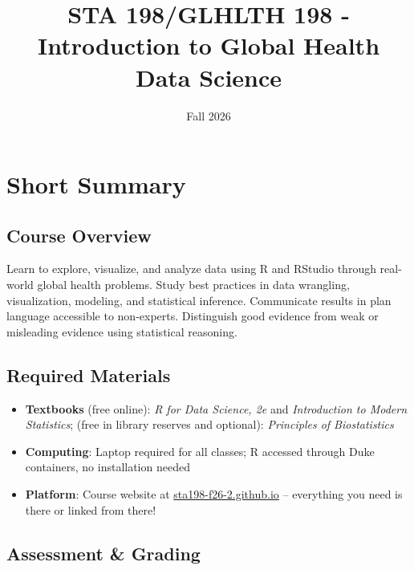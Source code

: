 \documentclass[
  letterpaper,
  DIV=11,
  numbers=noendperiod]{scrartcl}
\title{STA 198/GLHLTH 198 - Introduction to Global Health Data Science}
\subtitle{Fall 2026}
\author{}
\date{}
\providecommand{\tightlist}{%
  \setlength{\itemsep}{0pt}\setlength{\parskip}{0pt}}
\renewcommand*\contentsname{Table of contents}
\newcommand\contentsname{Table of contents}
\begin{document}
\maketitle

\renewcommand*\contentsname{Table of contents}
{
\setcounter{tocdepth}{3}
\tableofcontents
}

\section{Short Summary}\label{short-summary}

\subsection{Course Overview}\label{course-overview}

Learn to explore, visualize, and analyze data using R and RStudio
through real-world global health problems. Study best practices in data
wrangling, visualization, modeling, and statistical inference.
Communicate results in plan language accessible to non-experts.
Distinguish good evidence from weak or misleading evidence using
statistical reasoning.

\subsection{Required Materials}\label{required-materials}

\begin{itemize}
\tightlist
\item
  \textbf{Textbooks} (free online): \emph{R for Data Science, 2e} and
  \emph{Introduction to Modern Statistics}; (free in library reserves
  and optional): \emph{Principles of Biostatistics}
\item
  \textbf{Computing}: Laptop required for all classes; R accessed
  through Duke containers, no installation needed
\item
  \textbf{Platform}: Course website at
  \href{https://sta198-f26-2.github.io}{sta198-f26-2.github.io} --
  everything you need is there or linked from there!
\end{itemize}

\subsection{Assessment \& Grading}\label{assessment-grading}
\end{document}
